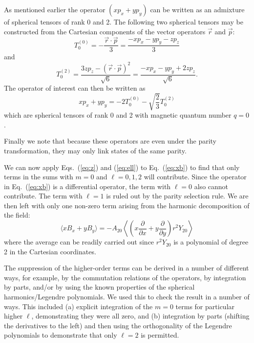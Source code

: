 \documentclass[preprint,12pt]{elsarticle}
\begin{document}
As mentioned earlier the operator $(xp_x+yp_y)$ can be written as an
admixture of spherical tensors of rank 0 and 2.  The following two
spherical tensors may be constructed from the Cartesian components of
the vector operators $\vec{r}$ and $\vec{p}$:
\begin{equation}
T_0^{(0)}=-\frac{\vec{r}\cdot\vec{p}}{3}=\frac{-xp_x-yp_y-zp_z}{3}
\end{equation}
and
\begin{equation}
T_0^{(2)}=\frac{3zp_z-(\vec{r}\cdot\vec{p})^2}{\sqrt{6}}=\frac{-xp_x-yp_y+2zp_z}{\sqrt{6}}.
\end{equation}
The operator of interest can then be written as
\begin{equation}
xp_x+yp_y=-2T_0^{(0)}-\sqrt{\frac{2}{3}}T_0^{(2)}
\end{equation}
which are spherical tensors of rank 0 and 2 with magnetic quantum
number $q=0$.

Finally we note that because these operators are even under the parity
transformation, they may only link states of the same parity.

We can now apply Eqs.~(\ref{eq:z}) and (\ref{eq:ell}) to
Eq.~(\ref{eq:xb}) to find that only terms in the sums with $m=0$ and
$\ell=0,1,2$ will contribute.  Since the operator in Eq.~(\ref{eq:xb})
is a differential operator, the term with $\ell=0$ also cannot
contribute.  The term with $\ell=1$ is ruled out by the parity
selection rule.  We are then left with only one non-zero term arising
from the harmonic decomposition of the field:
\begin{equation}
\langle
xB_x+yB_y\rangle=-A_{20}\left\langle\left(x\frac{\partial}{\partial
  x}+y\frac{\partial}{\partial y}\right)r^2 Y_{20}\right\rangle
\end{equation}
where the average can be readily carried out since $r^2Y_{20}$ is a
polynomial of degree 2 in the Cartesian coordinates.

The suppression of the higher-order terms can be derived in a number
of different ways, for example, by the commutation relations of the
operators, by integration by parts, and/or by using the known
properties of the spherical harmonics/Legendre polynomials.  We used
this to check the result in a number of ways.  This included (a)
explicit integration of the $m=0$ terms for particular higher $\ell$,
demonstrating they were all zero, and (b) integration by parts
(shifting the derivatives to the left) and then using the
orthogonality of the Legendre polynomials to demonstrate that only
$\ell=2$ is permitted.
\end{document}
